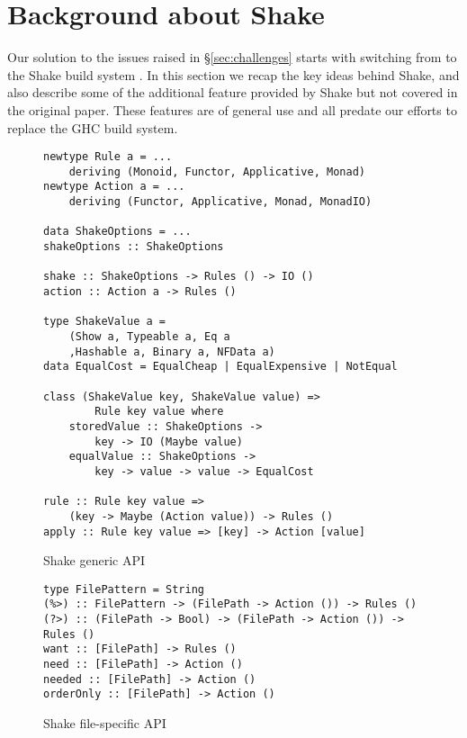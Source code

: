 \section{Background about Shake\label{sec:shake}}

Our solution to the issues raised in \S\ref{sec:challenges} starts with switching from \make{} to the Shake build system \cite{shake}. In this section we recap the key ideas behind Shake, and also describe some of the additional feature provided by Shake but not covered in the original paper. These features are of general use and all predate our efforts to replace the GHC build system.

\begin{figure}
\begin{lstlisting}
newtype Rule a = ...
    deriving (Monoid, Functor, Applicative, Monad)
newtype Action a = ...
    deriving (Functor, Applicative, Monad, MonadIO)

data ShakeOptions = ...
shakeOptions :: ShakeOptions

shake :: ShakeOptions -> Rules () -> IO ()
action :: Action a -> Rules ()

type ShakeValue a =
    (Show a, Typeable a, Eq a
    ,Hashable a, Binary a, NFData a)
data EqualCost = EqualCheap | EqualExpensive | NotEqual

class (ShakeValue key, ShakeValue value) =>
        Rule key value where
    storedValue :: ShakeOptions ->
        key -> IO (Maybe value)
    equalValue :: ShakeOptions ->
        key -> value -> value -> EqualCost

rule :: Rule key value =>
    (key -> Maybe (Action value)) -> Rules ()
apply :: Rule key value => [key] -> Action [value]
\end{lstlisting}
\caption{Shake generic API\label{fig:shake_generic_api}}
\end{figure}

\begin{figure}
\begin{lstlisting}
type FilePattern = String
(%>) :: FilePattern -> (FilePath -> Action ()) -> Rules ()
(?>) :: (FilePath -> Bool) -> (FilePath -> Action ()) -> Rules ()
want :: [FilePath] -> Rules ()
need :: [FilePath] -> Action ()
needed :: [FilePath] -> Action ()
orderOnly :: [FilePath] -> Action ()
\end{lstlisting}
\caption{Shake file-specific API\label{fig:shake_file_api}}
\end{figure}

